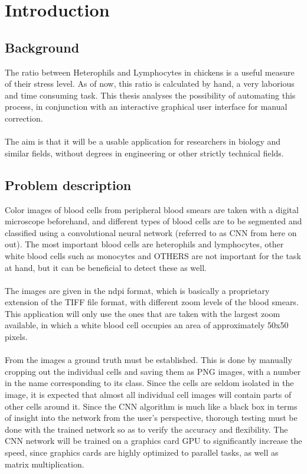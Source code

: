 \chapter{Introduction}\label{cha:intro}

\section{Background}
The ratio between Heterophils and Lymphocytes in chickens is a useful measure of their stress level. As of now, this ratio is calculated by hand, a very laborious and time consuming task. This thesis analyses the possibility of automating this process, in conjunction with an interactive graphical user interface for manual correction.\\\\
The aim is that it will be a usable application for researchers in biology and similar fields, without degrees in engineering or other strictly technical fields.


\section{Problem description}
Color images of blood cells from peripheral blood smears are taken with a digital microscope beforehand, and different types of blood cells are to be segmented and classified using a convolutional neural network (referred to as CNN from here on out). The most important blood cells are heterophils and lymphocytes, other white blood cells such as monocytes and  OTHERS are not important for the task at hand, but it can be beneficial to detect these as well.\\\\
The images are given in the ndpi format, which is basically a proprietary extension of the TIFF file format, with different zoom levels of the blood smears. This application will only use the ones that are taken with the largest zoom available, in which a white blood cell occupies an area of approximately 50x50 pixels.\\\\
From the images a ground truth must be established. This is done by manually cropping out the individual cells and saving them as PNG images, with a number in the name corresponding to its class. Since the cells are seldom isolated in the image, it is expected that almost all individual cell images will contain parts of other cells around it. 
Since the CNN algorithm is much like a black box in terms of insight into the network from the user's perspective, thorough testing must be done with the trained network so as to verify the accuracy and flexibility.
The CNN network will be trained on a graphics card GPU to significantly increase the speed, since graphics cards are highly optimized to parallel tasks, as well as matrix multiplication. 


